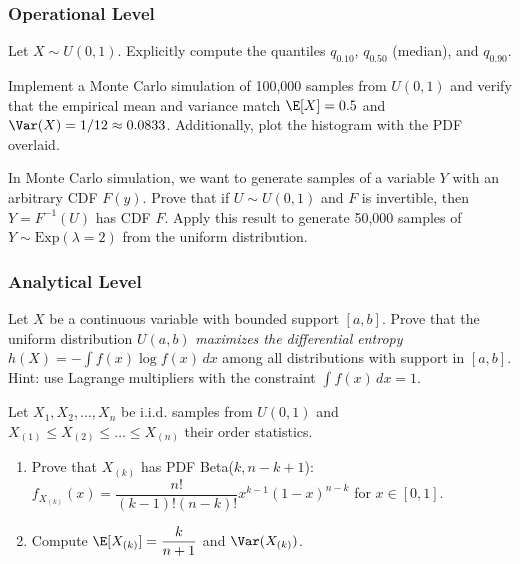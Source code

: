 \subsubsection*{Operational Level}

\begin{problema}
	\label{prob:4.4.4}
	Let $X \sim U(0, 1)$. Explicitly compute the quantiles $q_{0.10}$, $q_{0.50}$ (median), and $q_{0.90}$.
\end{problema}

\begin{problema}
	\label{prob:4.4.5}
	Implement a Monte Carlo simulation of 100{,}000 samples from $U(0, 1)$ and verify that the empirical mean and variance match $\E[X] = 0.5$ and $\Var(X) = 1/12 \approx 0.0833$. Additionally, plot the histogram with the PDF overlaid.
\end{problema}

\begin{problema}
	\label{prob:4.4.6}
	In Monte Carlo simulation, we want to generate samples of a variable $Y$ with an arbitrary CDF $F(y)$. Prove that if $U \sim U(0, 1)$ and $F$ is invertible, then $Y = F^{-1}(U)$ has CDF $F$. Apply this result to generate 50{,}000 samples of $Y \sim \text{Exp}(\lambda = 2)$ from the uniform distribution.
\end{problema}

\subsubsection*{Analytical Level}

\begin{problema}
	\label{prob:4.4.7}
	Let $X$ be a continuous variable with bounded support $[a, b]$. Prove that the uniform distribution $U(a, b)$ \emph{maximizes the differential entropy} $h(X) = -\int f(x) \log f(x)\,dx$ among all distributions with support in $[a, b]$. Hint: use Lagrange multipliers with the constraint $\int f(x)\,dx = 1$.
\end{problema}

\begin{problema}
	\label{prob:4.4.8}
	Let $X_{1}, X_{2}, \dots, X_{n}$ be i.i.d. samples from $U(0, 1)$ and $X_{(1)} \le X_{(2)} \le \dots \le X_{(n)}$ their order statistics.
	\begin{enumerate}
		\item Prove that $X_{(k)}$ has PDF Beta($k, n - k + 1$): $f_{X_{(k)}}(x) = \dfrac{n!}{(k-1)!(n-k)!} x^{k-1} (1-x)^{n-k}$ for $x \in [0, 1]$.
		\item Compute $\E[X_{(k)}] = \dfrac{k}{n+1}$ and $\Var(X_{(k)})$.
	\end{enumerate}
\end{problema}

